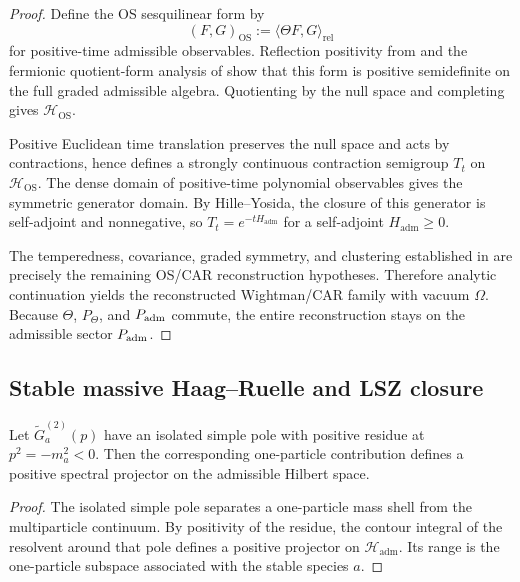 \begin{proof}
Define the OS sesquilinear form by
\[
(F,G)_{\mathrm{OS}}:=\langle \Theta F,G\rangle_{\mathrm{rel}}
\]
for positive-time admissible observables. Reflection positivity from
 and the fermionic quotient-form analysis of
 show that this form is positive semidefinite on the full graded admissible
algebra. Quotienting by the null space and completing gives $\mathcal H_{\mathrm{OS}}$.

Positive Euclidean time translation preserves the null space and acts by contractions, hence defines
a strongly continuous contraction semigroup $T_t$ on $\mathcal H_{\mathrm{OS}}$. The dense domain of
positive-time polynomial observables gives the symmetric generator domain. By Hille--Yosida, the
closure of this generator is self-adjoint and nonnegative, so $T_t=e^{-tH_{\mathrm{adm}}}$ for a
self-adjoint $H_{\mathrm{adm}}\ge 0$.

The temperedness, covariance, graded symmetry, and clustering established in
 are precisely the
remaining OS/CAR reconstruction hypotheses. Therefore analytic continuation yields the reconstructed
Wightman/CAR family with vacuum $\Omega$. Because $\Theta$, $P_\Theta$, and $P_{\mathrm{adm}}$ commute, the
entire reconstruction stays on the admissible sector $P_{\mathrm{adm}}$.
\end{proof}

\subsection{Stable massive Haag--Ruelle and LSZ closure}

\begin{lemma}
\label{lem:one-particle-projectors-from-poles}
Let $\widetilde G_a^{(2)}(p)$ have an isolated simple pole with positive residue at
$p^2=-m_a^2<0$. Then the corresponding one-particle contribution defines a positive spectral
projector on the admissible Hilbert space.
\end{lemma}

\begin{proof}
The isolated simple pole separates a one-particle mass shell from the multiparticle continuum. By
positivity of the residue, the contour integral of the resolvent around that pole defines a positive
projector on $\mathcal H_{\mathrm{adm}}$. Its range is the one-particle subspace associated with the
stable species $a$.
\end{proof}

